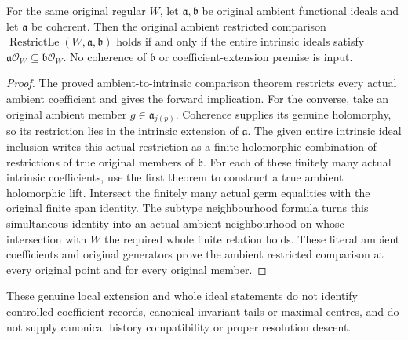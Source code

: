 \begin{theorem}
\label{hir:actual-submanifold-intrinsic-restrict-comparison-iff}
\leanok
For the same original regular $W$, let $\mathfrak a,\mathfrak b$ be
original ambient functional ideals and let $\mathfrak a$ be coherent.
Then the original ambient restricted comparison
$\operatorname{RestrictLe}(W,\mathfrak a,\mathfrak b)$ holds if and only if
the entire intrinsic ideals satisfy
$\mathfrak a\mathcal O_W\subseteq\mathfrak b\mathcal O_W$.
No coherence of $\mathfrak b$ or coefficient-extension premise is input.
\end{theorem}
\begin{proof}
The proved ambient-to-intrinsic comparison theorem restricts every
actual ambient coefficient and gives the forward implication. For the
converse, take an original ambient member $g\in\mathfrak a_{j(p)}$.
Coherence supplies its genuine holomorphy, so its restriction lies in
the intrinsic extension of $\mathfrak a$. The given entire intrinsic
ideal inclusion writes this actual restriction as a finite holomorphic
combination of restrictions of true original members of $\mathfrak b$.
For each of these finitely many actual intrinsic coefficients, use the
first theorem to construct a true ambient holomorphic lift. Intersect
the finitely many actual germ equalities with the original finite span
identity. The subtype neighbourhood formula turns this simultaneous
identity into an actual ambient neighbourhood on whose intersection
with $W$ the required whole finite relation holds. These literal ambient
coefficients and original generators prove the ambient restricted
comparison at every original point and for every original member.
\end{proof}

These genuine local extension and whole ideal statements do not identify
controlled coefficient records, canonical invariant tails or maximal centres,
and do not supply canonical history compatibility or proper resolution descent.
